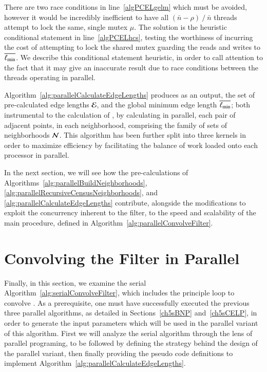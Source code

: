 There are two race conditions in line~\ref{algPCELgelm} which must be avoided, however it would be incredibly inefficient to have all $(\bar{n}-\rho)\mathbin{/}\bar{n}$ threads attempt to lock the same, single mutex $\mu$. The solution is the heuristic conditional statement in line~\ref{algPCELhcs}, testing the worthiness of incurring the cost of attempting to lock the shared mutex guarding the reads and writes to $\overline{\ell_\text{min}}$. We describe this conditional statement heuristic, in order to call attention to the fact that it may give an inaccurate result due to race conditions between the threads operating in parallel. 

Algorithm~\ref{alg:parallelCalculateEdgeLengths} produces as an output, the set of pre-calculated edge lengths $\mathcal{E}$, and the global minimum edge length $\overline{\ell_\text{min}}$; both instrumental to the calculation of , by calculating in parallel, each pair of adjacent points, in each neighborhood, comprising the family of sets of neighborhoods $\mathcal{N}$. This algorithm has been further split into three kernels in order to maximize efficiency by facilitating the balance of work loaded onto each processor in parallel.

In the next section, we will see how the pre-calculations of Algorithms~\ref{alg:parallelBuildNeighborhoods}, \ref{alg:parallelRecursiveCensusNeighborhoods}, and \ref{alg:parallelCalculateEdgeLengths} contribute, alongside the modifications to exploit the concurrency inherent to the filter, to the speed and scalability of the main procedure, defined in Algorithm~\ref{alg:parallelConvolveFilter}.

%
%
%
%
\section{Convolving the Filter in Parallel}
\label{ch5sCFP}
Finally, in this section, we examine the serial Algorithm~\ref{alg:serialConvolveFilter}, which includes the principle loop to convolve . As a prerequisite, one must have successfully executed the previous three parallel algorithms, as detailed in Sections~\ref{ch5sBNP} and~\ref{ch5sCELP}, in order to generate the input parameters which will be used in the parallel variant of this algorithm. First we will analyze the serial algorithm through the lens of parallel programing, to be followed by defining the strategy behind the design of the parallel variant, then finally providing the pseudo code definitions to implement Algorithm~\ref{alg:parallelCalculateEdgeLengths}.

